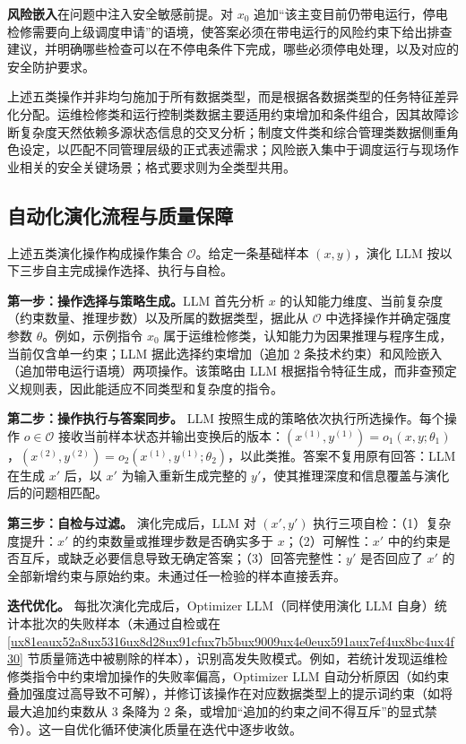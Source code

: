 \documentclass[fontset=fandol,type=master,campus=shenzhen,etitleauto=true]{hithesisbook}
\begin{document}
\textbf{风险嵌入}在问题中注入安全敏感前提。对 $x_0$ 追加``该主变目前仍带电运行，停电检修需要向上级调度申请''的语境，使答案必须在带电运行的风险约束下给出排查建议，并明确哪些检查可以在不停电条件下完成，哪些必须停电处理，以及对应的安全防护要求。

上述五类操作并非均匀施加于所有数据类型，而是根据各数据类型的任务特征差异化分配。运维检修类和运行控制类数据主要适用约束增加和条件组合，因其故障诊断复杂度天然依赖多源状态信息的交叉分析；制度文件类和综合管理类数据侧重角色设定，以匹配不同管理层级的正式表述需求；风险嵌入集中于调度运行与现场作业相关的安全关键场景；格式要求则为全类型共用。

\subsection{自动化演化流程与质量保障}\label{ux4ebaux673aux534fux540cux5ba1ux6838ux673aux5236}

上述五类演化操作构成操作集合 $\mathcal{O}$。给定一条基础样本 $(x, y)$，演化 LLM 按以下三步自主完成操作选择、执行与自检。

\textbf{第一步：操作选择与策略生成。}LLM 首先分析 $x$ 的认知能力维度、当前复杂度（约束数量、推理步数）以及所属的数据类型，据此从 $\mathcal{O}$ 中选择操作并确定强度参数 $\theta$。例如，示例指令 $x_0$ 属于运维检修类，认知能力为因果推理与程序生成，当前仅含单一约束；LLM 据此选择约束增加（追加 2 条技术约束）和风险嵌入（追加带电运行语境）两项操作。该策略由 LLM 根据指令特征生成，而非查预定义规则表，因此能适应不同类型和复杂度的指令。

\textbf{第二步：操作执行与答案同步。} LLM 按照生成的策略依次执行所选操作。每个操作 $o \in \mathcal{O}$ 接收当前样本状态并输出变换后的版本：$(x^{(1)}, y^{(1)}) = o_1(x, y; \theta_1)$，$(x^{(2)}, y^{(2)}) = o_2(x^{(1)}, y^{(1)}; \theta_2)$，以此类推。答案不复用原有回答：LLM 在生成 $x'$ 后，以 $x'$ 为输入重新生成完整的 $y'$，使其推理深度和信息覆盖与演化后的问题相匹配。

\textbf{第三步：自检与过滤。} 演化完成后，LLM 对 $(x', y')$ 执行三项自检：（1）复杂度提升：$x'$ 的约束数量或推理步数是否确实多于 $x$；（2）可解性：$x'$ 中的约束是否互斥，或缺乏必要信息导致无确定答案；（3）回答完整性：$y'$ 是否回应了 $x'$ 的全部新增约束与原始约束。未通过任一检验的样本直接丢弃。

\textbf{迭代优化。} 每批次演化完成后，Optimizer LLM（同样使用演化 LLM 自身）统计本批次的失败样本（未通过自检或在 \ref{ux81eaux52a8ux5316ux8d28ux91cfux7b5bux9009ux4e0eux591aux7ef4ux8bc4ux4f30} 节质量筛选中被剔除的样本），识别高发失败模式。例如，若统计发现运维检修类指令中约束增加操作的失败率偏高，Optimizer LLM 自动分析原因（如约束叠加强度过高导致不可解），并修订该操作在对应数据类型上的提示词约束（如将最大追加约束数从 3 条降为 2 条，或增加``追加的约束之间不得互斥''的显式禁令）。这一自优化循环使演化质量在迭代中逐步收敛。
\end{document}
